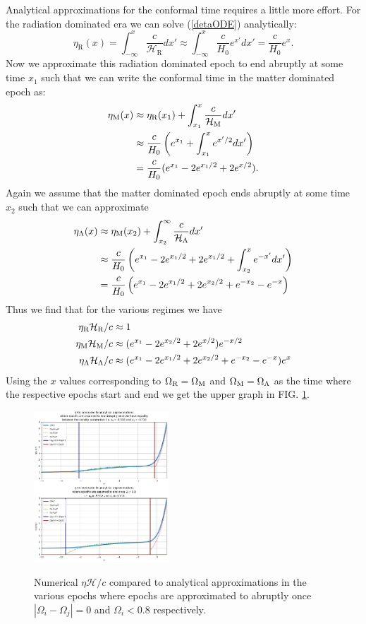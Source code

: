 \documentclass[%
reprint,
 amsmath,amssymb,
 aps,
]{revtex4-2}
\newcommand{\Hp}{\mathcal{H}}
\begin{document}
Analytical approximations for the conformal time requires a little more effort. For the radiation dominated era we can solve (\ref{detaODE}) analytically:
\[\eta_\text{R}(x)=\int_{-\infty}^x\frac{c}{\Hp_\text{R}}dx'\approx\int_{-\infty}^x\frac{c}{H_0}e^{x'}dx'=\frac{c}{H_0}e^x.\]
Now we approximate this radiation dominated epoch to end abruptly at some time $x_1$ such that we can write the conformal time in the matter dominated epoch as:
\begin{align*}
	\eta_\text M(x)&\approx\eta_\text{R}(x_1)+\int_{x_1}^x\frac{c}{\Hp_\text M}dx'\\
	&\approx\frac{c}{H_0}\left(e^{x_1}+\int_{x_1}^xe^{x'/2}dx' \right)\\
	&=\frac{c}{H_0}(e^{x_1}-2e^{x_1/2}+2e^{x/2}).
\end{align*}
Again we assume that the matter dominated epoch ends abruptly at some time $x_2$ such that we can approximate
\begin{align*}
	\eta_\Lambda(x)&\approx\eta_\text M(x_2)+\int_{x_2}^\infty\frac{c}{\Hp_\Lambda}dx'\\
	&\approx\frac{c}{H_0}\left(e^{x_1}-2e^{x_1/2}+2e^{x_1/2}+\int_{x_2}^x e^{-x'}dx' \right)\\
	&=\frac{c}{H_0}\left(e^{x_1}-2e^{x_1/2}+2e^{x_2/2}+e^{-x_2}-e^{-x} \right)
\end{align*}
Thus we find that for the various regimes we have
\begin{align*}
	\eta_\text{R}\Hp_\text{R}/c&\approx1\\
	\eta_\text M\Hp_\text M/c&\approx(e^{x_1}-2e^{x_2/2}+2e^{x/2})e^{-x/2}\\
	\eta_\Lambda\Hp_\Lambda/c&\approx(e^{x_1}-2e^{x_1/2}+2e^{x_2/2}+e^{-x_2}-e^{-x})e^{x}
\end{align*}
Using the $x$ values corresponding to $\Omega_{\text{R}}=\Omega_\text M$ and $\Omega_{\text M}=\Omega_\Lambda$ as the time where the respective epochs start and end we get the upper graph in FIG. \ref{eta_vs_anal_merge}.
\begin{figure}
	\caption{Numerical $\eta\Hp/c$ compared to analytical approximations in the various epochs where epochs are approximated to abruptly once $|\Omega_i-\Omega_j|=0$ and $\Omega_i<0.8$ respectively.}
	\includegraphics[width = 0.45\textwidth]{Figures/Eta_vs_anal_merge.png}
	\label{eta_vs_anal_merge}
\end{figure}
\end{document}
